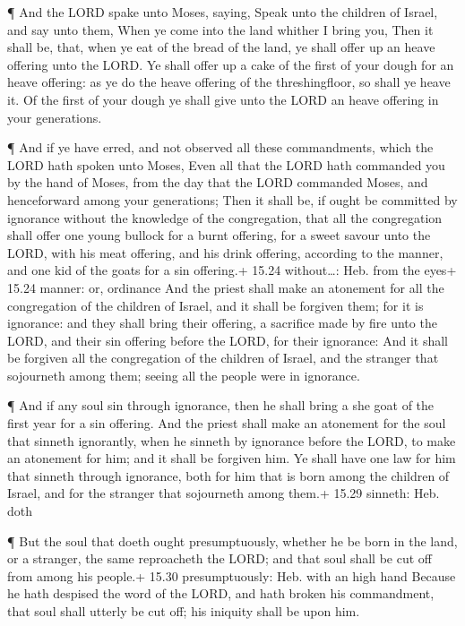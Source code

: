  ¶ And the LORD spake unto Moses, saying, 
Speak unto the children of Israel, and say unto them, When ye come into
the land whither I bring you,  Then it shall be, that, when
ye eat of the bread of the land, ye shall offer up an heave offering
unto the LORD.  Ye shall offer up a cake of the first of
your dough for an heave offering: as ye do the heave offering of the
threshingfloor, so shall ye heave it.  Of the first of your
dough ye shall give unto the LORD an heave offering in your generations.

 ¶ And if ye have erred, and not observed all these
commandments, which the LORD hath spoken unto Moses,  Even
all that the LORD hath commanded you by the hand of Moses, from the day
that the LORD commanded Moses, and henceforward among your generations;
 Then it shall be, if ought be committed by ignorance
without the knowledge of the congregation, that all the congregation
shall offer one young bullock for a burnt offering, for a sweet savour
unto the LORD, with his meat offering, and his drink offering, according
to the manner, and one kid of the goats for a sin offering.+ 15.24
without\ldots: Heb. from the eyes+ 15.24 manner: or, ordinance
 And the priest shall make an atonement for all the
congregation of the children of Israel, and it shall be forgiven them;
for it is ignorance: and they shall bring their offering, a sacrifice
made by fire unto the LORD, and their sin offering before the LORD, for
their ignorance:  And it shall be forgiven all the
congregation of the children of Israel, and the stranger that sojourneth
among them; seeing all the people were in ignorance.

 ¶ And if any soul sin through ignorance, then he shall
bring a she goat of the first year for a sin offering.  And
the priest shall make an atonement for the soul that sinneth ignorantly,
when he sinneth by ignorance before the LORD, to make an atonement for
him; and it shall be forgiven him.  Ye shall have one law
for him that sinneth through ignorance, both for him that is born among
the children of Israel, and for the stranger that sojourneth among
them.+ 15.29 sinneth: Heb. doth

 ¶ But the soul that doeth ought presumptuously, whether he
be born in the land, or a stranger, the same reproacheth the LORD; and
that soul shall be cut off from among his people.+ 15.30 presumptuously:
Heb. with an high hand  Because he hath despised the word
of the LORD, and hath broken his commandment, that soul shall utterly be
cut off; his iniquity shall be upon him.

